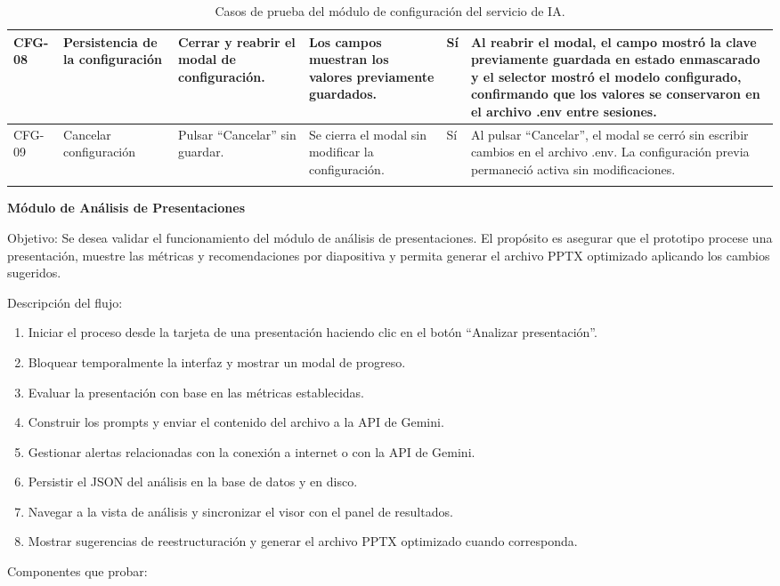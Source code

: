 \documentclass[11pt]{article}
\begin{document}
{\begin{longtable}{@{}|L{1.2cm}|L{2.5cm}|L{3.4cm}|L{3.8cm}|L{1.5cm}|L{2.3cm}|@{}}
CFG-08 & Persistencia de la configuración & Cerrar y reabrir el modal de configuración. & Los campos muestran los valores previamente guardados. & Sí & Al reabrir el modal, el campo mostró la clave previamente guardada en estado enmascarado y el selector mostró el modelo configurado, confirmando que los valores se conservaron en el archivo .env entre sesiones. \\ \hline
CFG-09 & Cancelar configuración & Pulsar ``Cancelar'' sin guardar. & Se cierra el modal sin modificar la configuración. & Sí & Al pulsar “Cancelar”, el modal se cerró sin escribir cambios en el archivo .env. La configuración previa permaneció activa sin modificaciones. \\ \hline
\caption{Casos de prueba del módulo de configuración del servicio de IA.}
\label{tab:cobertura-configuracion-ia}
\end{longtable}
}

\textbf{Módulo de Análisis de Presentaciones}

Objetivo: Se desea validar el funcionamiento del módulo de análisis de presentaciones. El propósito es asegurar que el prototipo procese una presentación, muestre las métricas y recomendaciones por diapositiva y permita generar el archivo PPTX optimizado aplicando los cambios sugeridos.

Descripción del flujo:
\begin{enumerate}
    \item Iniciar el proceso desde la tarjeta de una presentación haciendo clic en el botón ``Analizar presentación''.
    \item Bloquear temporalmente la interfaz y mostrar un modal de progreso.
    \item Evaluar la presentación con base en las métricas establecidas.
    \item Construir los prompts y enviar el contenido del archivo a la API de Gemini.
    \item Gestionar alertas relacionadas con la conexión a internet o con la API de Gemini.
    \item Persistir el JSON del análisis en la base de datos y en disco.
    \item Navegar a la vista de análisis y sincronizar el visor con el panel de resultados.
    \item Mostrar sugerencias de reestructuración y generar el archivo PPTX optimizado cuando corresponda.
\end{enumerate}

Componentes que probar:
\end{document}
